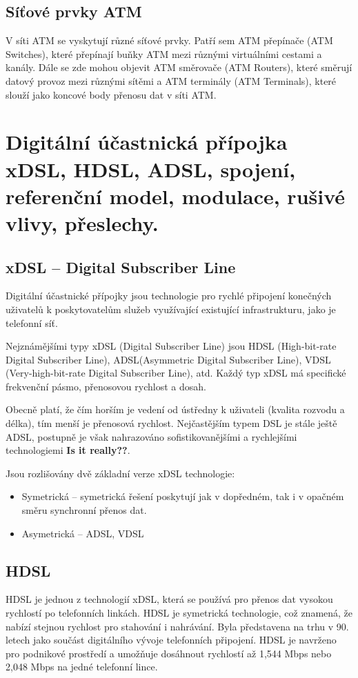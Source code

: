 \subsection{Síťové prvky ATM}
V síti ATM se vyskytují různé síťové prvky. Patří sem ATM přepínače (ATM Switches), které přepínají buňky ATM mezi různými virtuálními cestami a kanály. Dále se zde mohou objevit ATM směrovače (ATM Routers), které směrují datový provoz mezi různými sítěmi a ATM terminály (ATM Terminals), které slouží jako koncové body přenosu dat v síti ATM.

\clearpage
\section{Digitální účastnická přípojka xDSL, HDSL, ADSL, spojení, referenční model, modulace, rušivé vlivy, přeslechy.}

\subsection{xDSL -- Digital Subscriber Line}
Digitální účastnické přípojky jsou technologie pro rychlé připojení konečných uživatelů k poskytovatelům služeb využívající existující infrastrukturu, jako je telefonní síť.

Nejznámějšími typy xDSL (Digital Subscriber Line) jsou HDSL (High-bit-rate Digital Subscriber Line), ADSL(Asymmetric Digital Subscriber Line), VDSL (Very-high-bit-rate Digital Subscriber Line), atd. Každý typ xDSL má specifické frekvenční pásmo, přenosovou rychlost a dosah.

Obecně platí, že čím horším je vedení od ústředny k uživateli (kvalita rozvodu a délka), tím menší je přenosová rychlost. Nejčastějším typem DSL je stále ještě ADSL, postupně je však nahrazováno sofistikovanějšími a rychlejšími technologiemi \textbf{Is it really??}.

Jsou rozlišovány dvě základní verze xDSL technologie:
\begin{itemize}
    \item Symetrická -- symetrická řešení poskytují jak v dopředném, tak i v opačném směru synchronní přenos dat.
    \item Asymetrická -- ADSL, VDSL
\end{itemize}

\subsection{HDSL}
HDSL je jednou z technologií xDSL, která se používá pro přenos dat vysokou rychlostí po telefonních linkách. HDSL je symetrická technologie, což znamená, že nabízí stejnou rychlost pro stahování i nahrávání. Byla představena na trhu v 90. letech jako součást digitálního vývoje telefonních připojení. HDSL je navrženo pro podnikové prostředí a umožňuje dosáhnout rychlostí až 1,544 Mbps nebo 2,048 Mbps na jedné telefonní lince.

